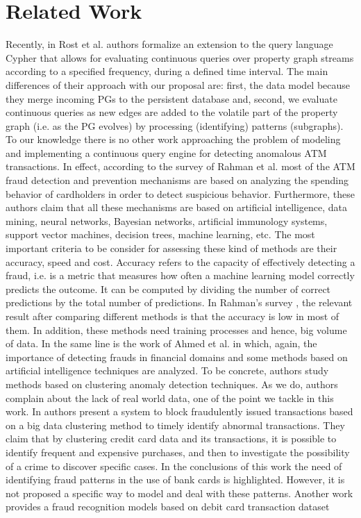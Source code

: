 \newpage
\section{Related Work}
\label{sec:related_work}

Recently, in Rost et al. \cite{rost2024seraph} authors formalize an extension to the query language Cypher that allows for evaluating  continuous queries over property graph streams according to a specified frequency, during a defined time interval. 
The main differences of their approach with our proposal are: first, the data model because they merge incoming PGs to the persistent database and, second, we evaluate continuous queries as new edges are added to the volatile part of the property graph (i.e.  as the PG evolves) by processing (identifying) patterns (subgraphs).
To our knowledge there is no other work approaching the problem of modeling and implementing a continuous query engine for detecting anomalous ATM transactions. In effect, according to the survey of Rahman et al. \cite{rahman2019comparative} most of the ATM fraud detection and prevention mechanisms are based on analyzing the spending behavior of cardholders in order to detect suspicious behavior. Furthermore, these authors claim that all these mechanisms are based on artificial intelligence, data mining, neural networks, Bayesian networks, artificial immunology systems, support vector machines, decision trees, machine learning, etc. The most important criteria to be consider for assessing these kind of methods are their accuracy, speed and cost. Accuracy refers to the capacity of effectively detecting a fraud, i.e. is a metric that measures how often a machine learning model correctly predicts the outcome. It can be computed by dividing the number of correct predictions by the total number of predictions. In Rahman's survey \cite{rahman2019comparative}, the relevant result after comparing different methods is that the accuracy is low in most of them. In addition, these methods need training processes and hence, big volume of data. In the same line is the work of Ahmed et al. \cite{ahmed2016survey} in which, again, the importance of detecting frauds in financial domains and  some methods based on artificial intelligence techniques are analyzed. To be concrete, authors study methods based on clustering  anomaly detection techniques. As we do, authors complain about the lack of real world data, one of the point we tackle in this work. 
In \cite{kian2022detection} authors present a system to block fraudulently issued transactions based on a big data clustering method to timely identify  abnormal transactions. They claim that by clustering credit card data and its transactions, it is possible to identify frequent and expensive purchases, and then to investigate the possibility of a crime to discover specific cases. In the conclusions of this work the need of identifying fraud patterns in the use of bank cards is highlighted. However, it is not proposed a specific way to model and deal with these patterns. Another work \cite{heryadi2016recognizing} provides a fraud recognition models based on debit card transaction dataset

